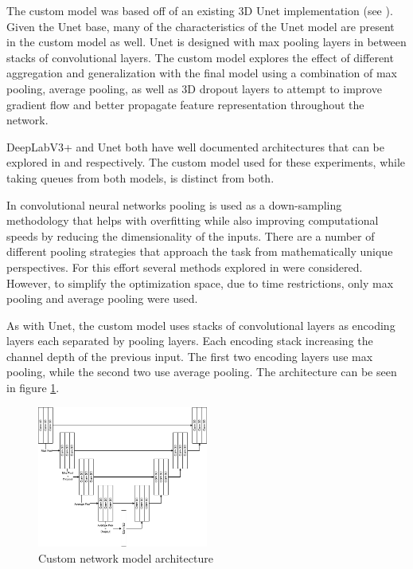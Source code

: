 \documentclass[10pt,twocolumn,letterpaper]{article}
\begin{document}
The custom model was based off of an existing 3D Unet implementation (see \cite{10.7554/eLife.57613}). Given the Unet base, many of the characteristics of the Unet model are present in the custom model as well. Unet is designed with max pooling layers in between stacks of convolutional layers. The custom model explores the effect of different aggregation and generalization with the final model using a combination of max pooling, average pooling, as well as 3D dropout layers to attempt to improve gradient flow and better propagate feature representation throughout the network.

DeepLabV3+ and Unet both have well documented architectures that can be explored in \cite{https://doi.org/10.48550/arxiv.1802.02611} and \cite{https://doi.org/10.48550/arxiv.1505.04597} respectively. The custom model used for these experiments, while taking queues from both models, is distinct from both.

In convolutional neural networks pooling is used as a down-sampling methodology that helps with overfitting while also improving computational speeds by reducing the dimensionality of the inputs. There are a number of different pooling strategies that approach the task from mathematically unique perspectives. For this effort several methods explored in \cite{https://doi.org/10.48550/arxiv.2009.07485} were considered. However, to simplify the optimization space, due to time restrictions, only max pooling and average pooling were used.

As with Unet, the custom model uses stacks of convolutional layers as encoding layers each separated by pooling layers. Each encoding stack increasing the channel depth of the previous input. The first two encoding layers use max pooling, while the second two use average pooling. The architecture can be seen in figure \ref{fig:custom-model-arch}.

\begin{figure}[h]
\centering
\includegraphics[width=0.5\textwidth]{figures/custom-model.png}
\caption{Custom network model architecture}
\label{fig:custom-model-arch}
\end{figure}
\end{document}
